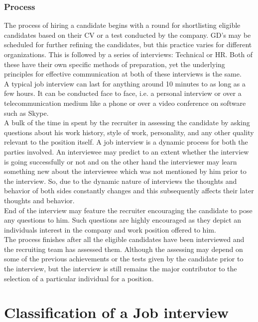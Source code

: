 \documentclass[a4paper,12pt]{report}
\begin{document}
\subsection{Process}                   %
The process of hiring a candidate begins with a round for shortlisting eligible candidates based on their CV or
a test conducted by the company. GD's may be scheduled for further refining the candidates, but this practice
varies for different organizations. This is followed by a series of interviews: Technical or HR. Both of these have their own specific
methods of preparation, yet the underlying principles for effective communication at both of these interviews is the same.\\
A typical job interview can last for anything around 10 minutes to as long as a few hours. It can be conducted face to face,
 i.e. a personal interview or over a telecommunication medium like a phone or over a video conference on software such as Skype.\\
A bulk of the time in spent by the recruiter in assessing the candidate by asking questions about his work history, style of work, personality,
and any other quality relevant to the position itself. A job interview is a dynamic process for both the parties involved.
An interviewee may predict to an extent whether the interview is going successfully or not and on the other hand the interviewer
may learn something new about the interviewee which was not mentioned by him prior to the interview. So,
due to the dynamic nature of interviews the thoughts and behavior of both sides constantly changes and
this subsequently affects their later thoughts and behavior.\\End of the interview may feature the recruiter encouraging the candidate to pose
any questions to him. Such questions are highly encouraged as they depict an individuals interest in the company and work position offered to him.\\
The process finishes after all the eligible candidates have been interviewed and the recruiting team has assessed them.
Although the assessing may depend on some of the previous achievements or the tests given by the candidate prior to the interview, but the interview
is still remains the major contributor to the selection of a particular individual for a position.


\chapter{Classification of a Job interview}           %
\end{document}
